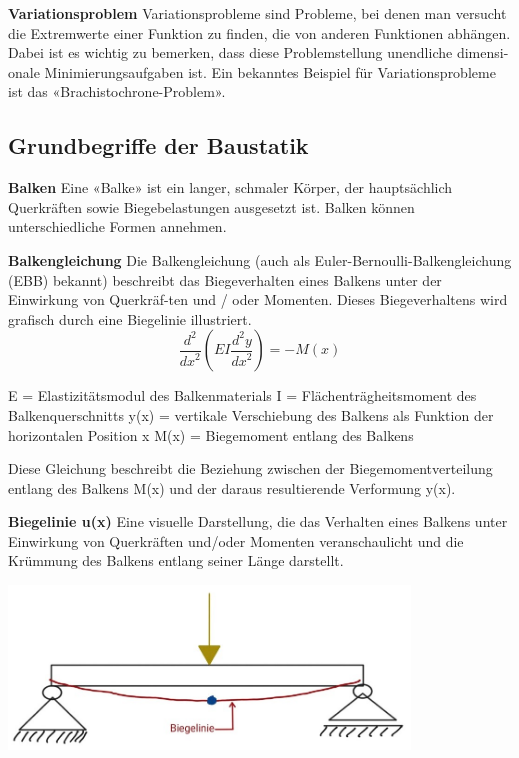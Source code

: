 \textbf{Variationsproblem}
Variationsprobleme sind Probleme, bei denen man versucht die Extremwerte einer Funktion zu finden, die von anderen Funktionen abhängen.
Dabei ist es wichtig zu bemerken, dass diese Problemstellung unendliche dimensi-onale Minimierungsaufgaben ist.
Ein bekanntes Beispiel für Variationsprobleme ist das «Brachistochrone-Problem».

\subsection{Grundbegriffe der Baustatik}
\textbf{Balken}
Eine «Balke» ist ein langer, schmaler Körper, der hauptsächlich Querkräften sowie Biegebelastungen ausgesetzt ist.
Balken können unterschiedliche Formen annehmen.

\textbf{Balkengleichung}
Die Balkengleichung (auch als Euler-Bernoulli-Balkengleichung (EBB) bekannt) beschreibt das Biegeverhalten eines Balkens unter der Einwirkung von Querkräf-ten und / oder Momenten.
Dieses Biegeverhaltens wird grafisch durch eine Biegelinie illustriert.
\begin{equation}
	\frac{d^2}{{dx}^2}\left(EI\frac{d^2y}{{dx}^2}\right)
	=-M(x)
\end{equation}
\label{Die Euler-Bernoulli-Balkengleichung}

E = Elastizitätsmodul des Balkenmaterials
I = Flächenträgheitsmoment des Balkenquerschnitts
y(x) = vertikale Verschiebung des Balkens als Funktion der horizontalen Position x
M(x) = Biegemoment entlang des Balkens

Diese Gleichung beschreibt die Beziehung zwischen der Biegemomentverteilung entlang des Balkens M(x) und der daraus resultierende Verformung y(x).

\textbf{Biegelinie u(x)}
Eine visuelle Darstellung, die das Verhalten eines Balkens unter Einwirkung von Querkräften und/oder Momenten veranschaulicht und die Krümmung des Balkens entlang seiner Länge darstellt.
\begin{center}
	\includegraphics[width=0.8\textwidth]{papers/balken/images/teil1/Biegelinie1.jpg}
\end{center}
\label{Abbildung der Biegelinie aufgrund einer Einzellast}

